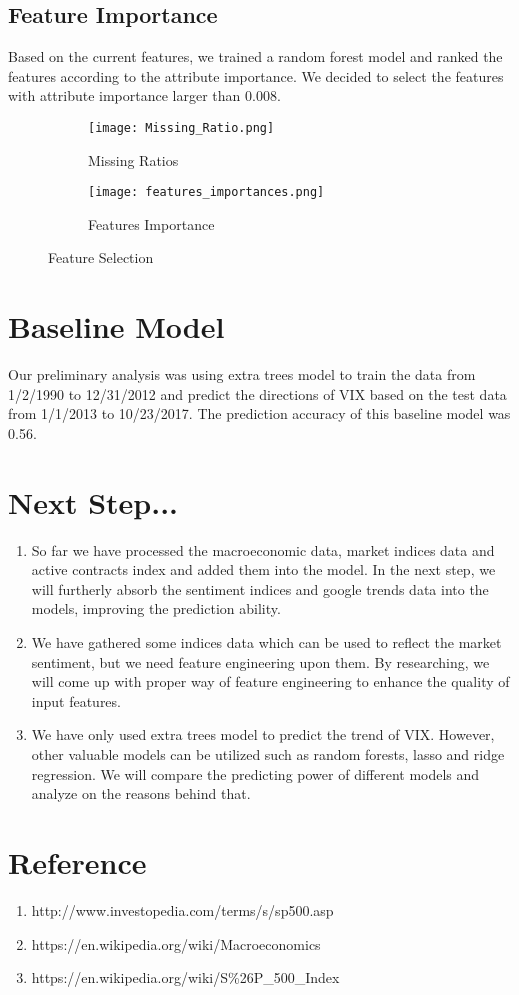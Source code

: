 \documentclass{article}
\begin{document}
\subsection*{Feature Importance}
Based on the current features, we trained a random forest model and ranked the features according to the attribute importance. We decided to select the features with attribute importance larger than 0.008. 

\begin{figure}[h]
\begin{subfigure}{.5\textwidth}
  \texttt{[image: Missing\_Ratio.png]}
  \caption{Missing Ratios}
  \label{fig:sub1}
\end{subfigure}
\begin{subfigure}{.5\textwidth}
  \texttt{[image: features\_importances.png]}
  \caption{Features Importance}
  \label{fig:sub2}
\end{subfigure}
\caption{Feature Selection}
\label{fig:image3}
\end{figure}

\section*{Baseline Model}
Our preliminary analysis was using extra trees model to train the data from 1/2/1990 to 12/31/2012 and predict the directions of VIX based on the test data from 1/1/2013 to 10/23/2017. The prediction accuracy of this baseline model was 0.56. 

\section*{Next Step...}

\begin{enumerate}
    \itemsep0em
    \item So far we have processed the macroeconomic data, market indices data and active contracts index and added them into the model. In the next step, we will furtherly absorb the sentiment indices and google trends data into the models, improving the prediction ability.
    \item We have gathered some indices data which can be used to reflect the market sentiment, but we need feature engineering upon them. By researching, we will come up with proper way of feature engineering to enhance the quality of input features.
    \item  We have only used extra trees model to predict the trend of VIX. However, other valuable models can be utilized such as random forests, lasso and ridge regression. We will compare the predicting power of different models and analyze on the reasons behind that. 
    
\end{enumerate}

\section*{Reference}
\begin{enumerate}
    \item http://www.investopedia.com/terms/s/sp500.asp
    \item https://en.wikipedia.org/wiki/Macroeconomics
    \item https://en.wikipedia.org/wiki/S\%26P\_500\_Index
\end{enumerate}
\end{document}
